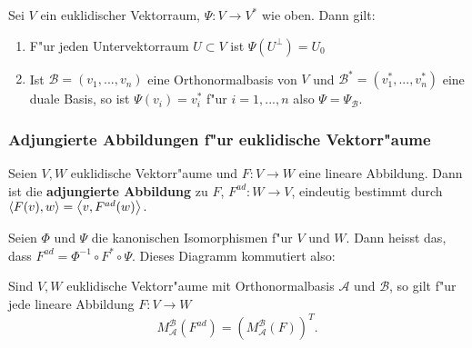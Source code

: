 \documentclass[9pt, a4paper, twocolumn, landscape]{article}
\newcommand{\comment}[1]{}
\begin{document}
\begin{theorem}
Sei $V$ ein euklidischer Vektorraum, $\Psi : V \rightarrow V^*$ wie oben. Dann gilt:
\begin{enumerate}
\item F"ur jeden Untervektorraum $U \subset V$ ist $\Psi(U^\perp) = U_0$
\item Ist $\mathcal{B} = (v_1, ..., v_n)$ eine Orthonormalbasis von $V$ und $\mathcal{B}^* = (v_1^*, ..., v_n^*)$ eine duale Basis, so ist $\Psi(v_i) = v_i^*$ f"ur $i = 1, ..., n$ also $\Psi = \Psi_\mathcal{B}$.
\end{enumerate}
\end{theorem}

\subsubsection{Adjungierte Abbildungen f"ur euklidische Vektorr"aume}


\begin{definition}
Seien $V, W$ euklidische Vektorr"aume und $F : V \rightarrow W$ eine lineare Abbildung. Dann ist die \textbf{adjungierte Abbildung} zu $F$,
$
F^{ad} : W \rightarrow V
$, eindeutig bestimmt  durch
$
\scp{F(v)}{w} = \scp{v}{F^{ad}(w)}.
$
\end{definition}


\begin{remark}
Seien $\Phi$ und $\Psi$ die kanonischen Isomorphismen f"ur $V$ und $W$. Dann heisst das, dass $F^{ad} = 
\Phi^{-1} \circ F^{*} \circ \Psi$.
Dieses Diagramm kommutiert also:
\begin{xy}
\end{xy}

\end{remark}




\begin{remark}
Sind $V, W$ euklidische Vektorr"aume mit Orthonormalbasis $\mathcal{A}$ und $\mathcal{B}$, so gilt f"ur jede lineare Abbildung $F : V \rightarrow W$
$$
M_\mathcal{A}^\mathcal{B}(F^{ad}) = \left( M_\mathcal{A}^\mathcal{B}(F)\right)^T.
$$
\end{remark}

\comment{
\begin{remark}
Sei $\mathcal{B}$ eine Orthonormalbasis von $V$, $F$ ein Endomorphismus und $A = M_\mathcal{B}(F)$. Dann ist der adjungierte Endormorphismus von $F$ eindeutig gegeben durch $M_\mathcal{B}(F^{ad}) = A^\dagger$.
\end{remark}
}
\end{document}
